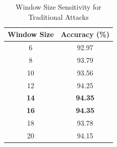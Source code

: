 
\begin{table}[t]
\centering
\caption{Window Size Sensitivity for Traditional Attacks}
\label{tab:traditional_window_sensitivity}
\begin{tabular}{cc}
\toprule
Window Size & Accuracy (\%) \\
\midrule
6 & 92.97 \\
8 & 93.79 \\
10 & 93.56 \\
12 & 94.25 \\
\textbf{14} & \textbf{94.35} \\
\textbf{16} & \textbf{94.35} \\
18 & 93.78 \\
20 & 94.15 \\
\bottomrule
\end{tabular}
\end{table}
